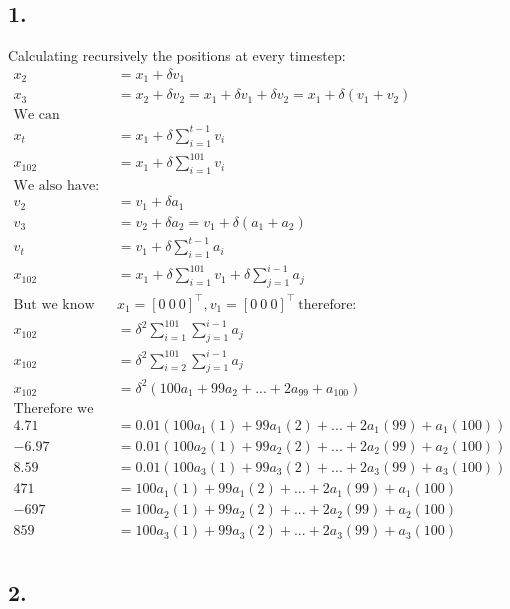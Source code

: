 \documentclass[11pt,a4paper,oneside]{report}
\begin{document}
\subsection*{1.}
Calculating recursively the positions at every timestep:
\begin{align*}
x_2 &= x_1 + \delta v_1\\
x_3 &= x_2 + \delta v_2 = x_1 + \delta v_1 + \delta v_2 = x_1 + \delta (v_1+v_2)\\
\text{We can therefore derive that:}&\\
x_t &= x_1 + \delta \sum_{i=1}^{t-1}v_i\\
x_{102} &= x_1 + \delta \sum_{i=1}^{101}v_i\\
\text{We also have:}&\\
v_2 &= v_1 + \delta a_1\\
v_3 &= v_2 + \delta a_2 = v_1 + \delta (a_1+a_2)\\
v_t &= v_1 + \delta \sum_{i=1}^{t-1}a_i\\
x_{102} &= x_1 + \delta \sum_{i=1}^{101} v_1 + \delta \sum_{j=1}^{i-1}a_j\\
\text{But we know that:}\ & x_1 = [ 0\ 0\ 0 ]^\top, v_1 = [0\ 0\ 0]^\top \ \text{therefore:} \\
x_{102} &= \delta^2 \sum_{i=1}^{101}\sum_{j=1}^{i-1}a_j\\
x_{102} &= \delta^2 \sum_{i=2}^{101}\sum_{j=1}^{i-1}a_j\\
x_{102} &= \delta^2 (100a_1+99a_2+...+2a_{99}+a_{100})\\
\text{Therefore we have that:}&\\
4.71 &= 0.01(100a_1(1)+99a_1(2)+...+2a_1(99)+a_1(100))\\
-6.97 &= 0.01(100a_2(1)+99a_2(2)+...+2a_2(99)+a_2(100))\\
8.59 &= 0.01(100a_3(1)+99a_3(2)+...+2a_3(99)+a_3(100))\\
471 &= 100a_1(1)+99a_1(2)+...+2a_1(99)+a_1(100)\\
-697 &= 100a_2(1)+99a_2(2)+...+2a_2(99)+a_2(100)\\
859 &= 100a_3(1)+99a_3(2)+...+2a_3(99)+a_3(100)\\
\end{align*}

\subsection*{2.}
\end{document}

